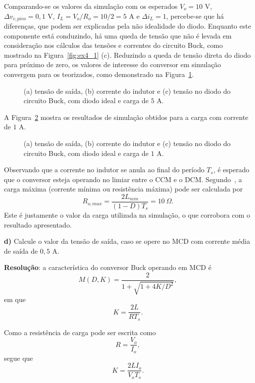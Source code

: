 Comparando-se os valores da simulação com os esperados $V_o = 10$ V, $\Delta v_{c,pico} = 0{,}1$ V, $I_L = V_o/R_o = 10/2 = 5$ A e $\Delta i_L = 1$, percebe-se que há diferenças, que podem ser explicadas pela não idealidade do diodo. Enquanto este componente está conduzindo, há uma queda de tensão que não é levada em consideração nos cálculos das tensões e correntes do circuito Buck, como mostrado na Figura~\ref{fig:ex4_1} (c). Reduzindo a queda de tensão direta do diodo para próximo de zero, os valores de interesse do conversor em simulação convergem para os teorizados, como demonstrado na Figura~\ref{fig:ex4_2}.
\begin{figure}[htb!]
	\centering
	
	\caption{(a) tensão de saída, (b) corrente do indutor e (c) tensão no diodo do circuito Buck, com diodo ideal e carga de $5$ A.}
	\label{fig:ex4_2}
\end{figure}

A Figura~\ref{fig:ex4_3} mostra os resultados de simulação obtidos para a carga com corrente de $1$ A.
\begin{figure}[htb!]
	\centering
	
	\caption{(a) tensão de saída, (b) corrente do indutor e (c) tensão no diodo do circuito Buck, com diodo ideal e carga de $1$ A.}
	\label{fig:ex4_3}
\end{figure}

Observando que a corrente no indutor se anula ao final do período $T_s$, é esperado que o conversor esteja operando no limiar entre o CCM e o DCM. Segundo~\cite{Eri:20}, a carga máxima (corrente mínima ou resistência máxima) pode ser calculada por
\begin{equation*}
	R_{o,max} = \frac{2L_{min}}{(1-D)T_s} = 10~\Omega.
\end{equation*}
Este é justamente o valor da carga utilizada na simulação, o que corrobora com o resultado apresentado.

\medskip
\textbf{d)} Calcule o valor da tensão de saída, caso se opere no MCD com corrente média de saída de $0{,}5$ A.

\medskip
\textbf{Resolução}: a característica do conversor Buck operando em MCD é
\begin{equation*}
	M(D,K) = \frac{2}{1 + \sqrt{1 + 4K/D^2}},
\end{equation*}
em que
\begin{equation*}
	K = \frac{2L}{RT_s}.
\end{equation*}

Como a resistência de carga pode ser escrita como
\begin{equation*}
	R = \frac{V_o}{I_o},
\end{equation*}
segue que
\begin{equation*}
	K = \frac{2LI_o}{V_oT_s}.
\end{equation*}

